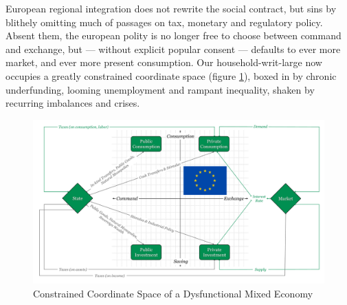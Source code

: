 \documentclass[11pt,a4paper,oneside,openright]{article}
\begin{document}
European regional integration does not rewrite the social contract, but sins by blithely omitting much of passages on tax, monetary and regulatory policy. 
Absent them, the european polity is no longer free to choose between %
command and exchange, but --- without explicit popular consent --- defaults to ever more market, and ever more present consumption. 
Our household-writ-large now occupies a greatly constrained coordinate space (figure \ref{fig:coordinate-space-constrained}), boxed in by chronic underfunding,  looming unemployment and rampant inequality, shaken by recurring imbalances and crises. 

\begin{figure}[htbp]
	\begin{center}
	\includegraphics[width=1\textwidth]{./img/coordinate-space-constrained}  
	\caption{Constrained Coordinate Space of a Dysfunctional Mixed Economy}
	\label{fig:coordinate-space-constrained}
	\end{center}
\end{figure}
\end{document}
